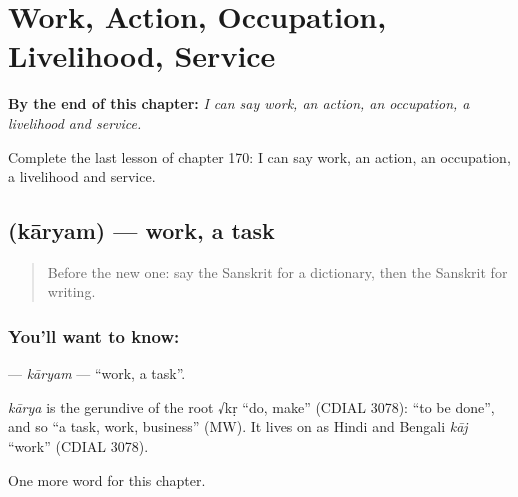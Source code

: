 
\chapter{Work, Action, Occupation, Livelihood, Service}
\label{ch:sa-work-action-occupation-livelihood-service}

\begin{chapteropening}
\textbf{By the end of this chapter:} \emph{I can say work, an action, an occupation, a livelihood and service.}

Complete the last lesson of chapter 170: I can say work, an action, an occupation, a livelihood and service.
\end{chapteropening}

\section[\texorpdfstring{\sk{कार्यम्} (kāryam)}{कार्यम् (kāryam)}]{ (kāryam) — work, a task}

\label{lesson:SA-C170-karyam}



\begin{quote}
Before the new one: say the Sanskrit for a dictionary, then the Sanskrit for writing.
\end{quote}

\subsection*{You'll want to know: }
\textbf{} — \emph{kāryam} — \textquotedblleft{}work, a task\textquotedblright{}.

\begin{cousinweb}
\emph{kārya} is the gerundive of the root √kṛ \textquotedblleft{}do, make\textquotedblright{} (CDIAL 3078): \textquotedblleft{}to be done\textquotedblright{}, and so \textquotedblleft{}a task, work, business\textquotedblright{} (MW). It lives on as Hindi and Bengali \emph{kāj} \textquotedblleft{}work\textquotedblright{} (CDIAL 3078).
\end{cousinweb}

\begin{grammarlens}[title={What you've built}]
One more word for this chapter.
\end{grammarlens}

